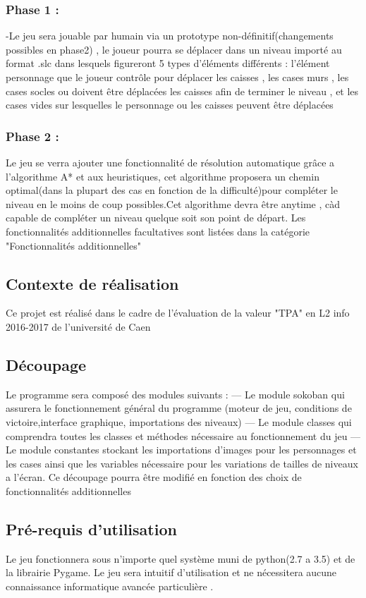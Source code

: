 \documentclass{article}
\begin{document}
			\subsubsection{Phase 1 :}
			-Le jeu sera jouable par humain via un prototype non-définitif(changements
possibles en phase2) , le joueur pourra se déplacer dans un niveau importé
au format .slc dans lesquels figureront 5 types d’éléments différents : l’élément
personnage que le joueur contrôle pour déplacer les caisses , les cases murs , les
cases socles ou doivent être déplacées les caisses afin de terminer le niveau , et
les cases vides sur lesquelles le personnage ou les caisses peuvent être déplacées
			\subsubsection{Phase 2 :}
			Le jeu se verra ajouter une fonctionnalité de résolution automatique grâce
a l’algorithme A* et aux heuristiques, cet algorithme proposera un chemin optimal(dans
la plupart des cas en fonction de la difficulté)pour compléter le niveau
en le moins de coup possibles.Cet algorithme devra être anytime , càd capable
de compléter un niveau quelque soit son point de départ.
Les fonctionnalités additionnelles facultatives sont listées dans la catégorie
"Fonctionnalités additionnelles"
		\subsection{Contexte de réalisation}
		Ce projet est réalisé dans le cadre de l’évaluation de la valeur "TPA" en L2
info 2016-2017 de l’université de Caen
		\subsection{Découpage}
		Le programme sera composé des modules suivants :
— Le module sokoban qui assurera le fonctionnement général du programme
(moteur de jeu, conditions de victoire,interface graphique, importations
des niveaux)
— Le module classes qui comprendra toutes les classes et méthodes nécessaire
au fonctionnement du jeu
— Le module constantes stockant les importations d’images pour les personnages
et les cases ainsi que les variables nécessaire pour les variations
de tailles de niveaux a l’écran.
Ce découpage pourra être modifié en fonction des choix de fonctionnalités additionnelles
		\subsection{Pré-requis d'utilisation}
		Le jeu fonctionnera sous n’importe quel système muni de python(2.7 a 3.5) et
de la librairie Pygame. Le jeu sera intuitif d’utilisation et ne nécessitera aucune
connaissance informatique avancée particulière .
\end{document}
